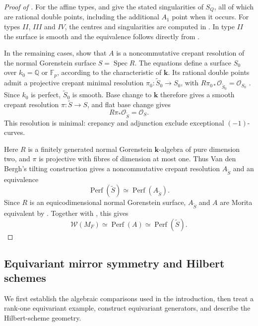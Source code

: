 \documentclass[a4paper]{amsart}
\newcommand{\kk}{\mathbf{k}}
\DeclareMathOperator{\Perf}{Perf}
\numberwithin{equation}{section}
\begin{document}
\begin{proof}[Proof of ]
For the affine types,  and 
give the stated singularities of $S_Q$, all of which are rational
double points, including the additional $A_1$ point when it occurs.
For types $II$, $III$ and $IV$, the centres and singularities are
computed in . In type $II$ the
surface is smooth and the equivalence follows directly from
.

In the remaining cases,
 show that $A$
is a noncommutative crepant resolution of the normal Gorenstein
surface $S=\operatorname{Spec}R$.
The equations define a surface $S_0$ over $k_0=\mathbb Q$ or
$\mathbb F_p$, according to the characteristic of $\kk$.
Its rational double points admit a projective crepant minimal
resolution $\pi_0:\widetilde S_0\to S_0$, with
$R\pi_{0*}\mathcal O_{\widetilde S_0}=\mathcal O_{S_0}$
\cite[Section~4 and Sections~23--24]{Lipman}.
Since $k_0$ is perfect, $\widetilde S_0$ is smooth. Base change to
$\kk$ therefore gives a smooth crepant resolution
$\pi:\widetilde S\to S$, and flat base change gives
\[
 R\pi_*\mathcal O_{\widetilde S}=\mathcal O_S.
\]
This resolution is minimal: crepancy and adjunction exclude
exceptional $(-1)$-curves.

Here $R$ is a finitely generated normal Gorenstein $\kk$-algebra
of pure dimension two, and $\pi$ is projective with fibres of
dimension at most one. Thus Van den Bergh's tilting construction
\cite[Section~3.2, Corollary~3.2.11]{VdBFlops} gives a
noncommutative crepant resolution $A_{\widetilde S}$ and an equivalence
\[
 \Perf(\widetilde S)\simeq\Perf(A_{\widetilde S}).
\]
Since $R$ is an equicodimensional normal Gorenstein surface,
$A_{\widetilde S}$ and $A$ are Morita equivalent by
\cite[Theorem~1.5(1)]{IyamaWemyss}. Together with ,
this gives
\[
 \mathcal W(M_F)\simeq\Perf(A)\simeq\Perf(\widetilde S).
\]
\end{proof}

\subsection{Equivariant mirror symmetry and Hilbert schemes}\label{sec:equivariant}

We first establish the algebraic comparisons used in the introduction,
then treat a rank-one equivariant example, construct equivariant
generators, and describe the Hilbert-scheme geometry.
\end{document}
